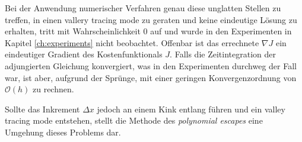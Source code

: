 Bei der Anwendung numerischer Verfahren genau diese unglatten Stellen zu treffen, in einen vallery tracing mode zu geraten und keine eindeutige Lösung zu erhalten, tritt mit Wahrscheinlichkeit $0$ auf und wurde in den Experimenten in Kapitel \ref{ch:experiments} nicht beobachtet.
Offenbar ist das errechnete $\nabla J$ ein eindeutiger Gradient des Kostenfunktionals $J$.
Falls die Zeitintegration der adjungierten Gleichung konvergiert, was in den Experimenten durchweg der Fall war, ist aber, aufgrund der Sprünge, mit einer geringen Konvergenzordnung von $\mathcal O(h)$ zu rechnen.

Sollte das Inkrement $\Delta x$ jedoch an einem Kink entlang führen und ein valley tracing mode entstehen, stellt die Methode des \textit{polynomial escapes} eine Umgehung dieses Problems dar. 

